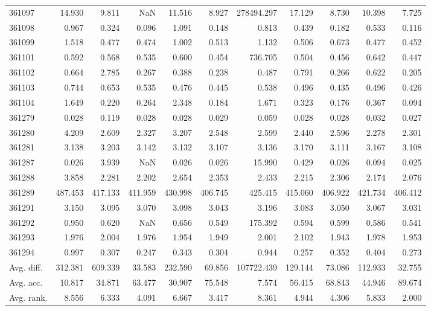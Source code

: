 \begin{tabular}{lrrrrrrrrrr}
361097 & 14.930 & 9.811 & NaN & 11.516 & 8.927 & 278494.297 & 17.129 & 8.730 & 10.398 & 7.725 \\
361098 & 0.967 & 0.324 & 0.096 & 1.091 & 0.148 & 0.813 & 0.439 & 0.182 & 0.533 & 0.116 \\
361099 & 1.518 & 0.477 & 0.474 & 1.002 & 0.513 & 1.132 & 0.506 & 0.673 & 0.477 & 0.452 \\
361101 & 0.592 & 0.568 & 0.535 & 0.600 & 0.454 & 736.705 & 0.504 & 0.456 & 0.642 & 0.447 \\
361102 & 0.664 & 2.785 & 0.267 & 0.388 & 0.238 & 0.487 & 0.791 & 0.266 & 0.622 & 0.205 \\
361103 & 0.744 & 0.653 & 0.535 & 0.476 & 0.445 & 0.538 & 0.496 & 0.435 & 0.496 & 0.426 \\
361104 & 1.649 & 0.220 & 0.264 & 2.348 & 0.184 & 1.671 & 0.323 & 0.176 & 0.367 & 0.094 \\
361279 & 0.028 & 0.119 & 0.028 & 0.028 & 0.029 & 0.059 & 0.028 & 0.028 & 0.032 & 0.027 \\
361280 & 4.209 & 2.609 & 2.327 & 3.207 & 2.548 & 2.599 & 2.440 & 2.596 & 2.278 & 2.301 \\
361281 & 3.138 & 3.203 & 3.142 & 3.132 & 3.107 & 3.136 & 3.170 & 3.111 & 3.167 & 3.108 \\
361287 & 0.026 & 3.939 & NaN & 0.026 & 0.026 & 15.990 & 0.429 & 0.026 & 0.094 & 0.025 \\
361288 & 3.858 & 2.281 & 2.202 & 2.654 & 2.353 & 2.433 & 2.215 & 2.306 & 2.174 & 2.076 \\
361289 & 487.453 & 417.133 & 411.959 & 430.998 & 406.745 & 425.415 & 415.060 & 406.922 & 421.734 & 406.412 \\
361291 & 3.150 & 3.095 & 3.070 & 3.098 & 3.043 & 3.196 & 3.083 & 3.050 & 3.067 & 3.031 \\
361292 & 0.950 & 0.620 & NaN & 0.656 & 0.549 & 175.392 & 0.594 & 0.599 & 0.586 & 0.541 \\
361293 & 1.976 & 2.004 & 1.976 & 1.954 & 1.949 & 2.001 & 2.102 & 1.943 & 1.978 & 1.953 \\
361294 & 0.997 & 0.307 & 0.247 & 0.343 & 0.304 & 0.944 & 0.257 & 0.352 & 0.404 & 0.273 \\
Avg. diff. & 312.381 & 609.339 & 33.583 & 232.590 & 69.856 & 107722.439 & 129.144 & 73.086 & 112.933 & 32.755 \\
Avg. acc. & 10.817 & 34.871 & 63.477 & 30.907 & 75.548 & 7.574 & 56.415 & 68.843 & 44.946 & 89.674 \\
Avg. rank. & 8.556 & 6.333 & 4.091 & 6.667 & 3.417 & 8.361 & 4.944 & 4.306 & 5.833 & 2.000 \\
\bottomrule
\end{tabular}
